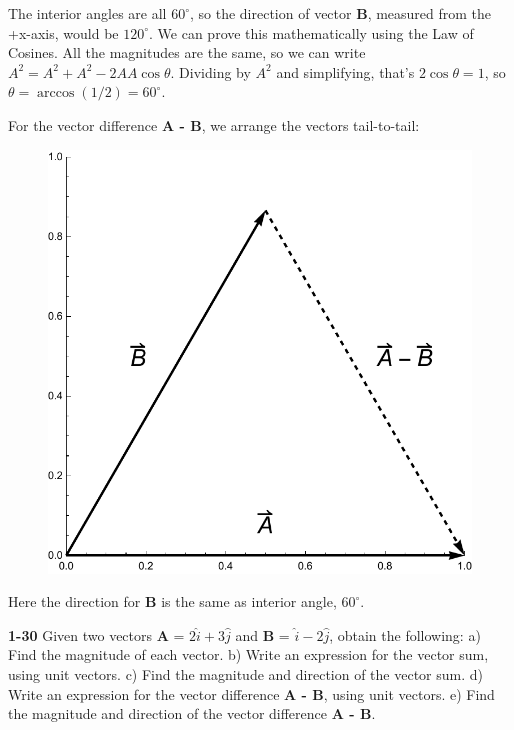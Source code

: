 \documentclass{amsart}
\begin{document}
The interior angles are all $60^\circ$, so the direction of vector \textbf{B}, measured from the +x-axis,
would be $120^\circ$.  We can prove this mathematically using the Law of Cosines.
All the magnitudes are the same, so we can write $A^2 = A^2 + A^2 - 2 A A \cos \theta$.
Dividing by $A^2$ and simplifying, that's $2 \cos \theta = 1$, so $\theta = \arccos (1/2) = 60^\circ$.

For the vector difference \textbf{A - B}, we arrange the vectors tail-to-tail:

\begin{figure}[h]
\includegraphics[scale=0.32]{1-29b}
\end{figure}

Here the direction for \textbf{B} is the same as interior angle, $60^\circ$.

\textbf{1-30} Given two vectors \textbf{A} = $2\hat i + 3\hat j$ and \textbf{B} = $\hat i -2\hat j$,
obtain the following:\newline
a) Find the magnitude of each vector.\newline
b) Write an expression for the vector sum, using unit vectors.\newline
c) Find the magnitude and direction of the vector sum.\newline
d) Write an expression for the vector difference \textbf{A - B}, using unit vectors.\newline
e) Find the magnitude and direction of the vector difference \textbf{A - B}.
\end{document}
